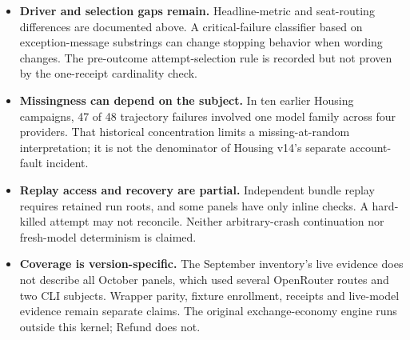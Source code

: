 \begin{itemize}
  compatibility reader coerced falsy values to empty lists, and a writer
  accepted pretty-printed bytes its reader rejected. Fixes and
  regression tests landed before the September snapshot. The incident
  motivates testing the verifier itself; a digest alone is not a
  correctness argument.
\item \textbf{Driver and selection gaps remain.} Headline-metric and
  seat-routing differences are documented above. A critical-failure
  classifier based on exception-message substrings can change stopping
  behavior when wording changes. The pre-outcome attempt-selection
  rule is recorded but not proven by the one-receipt cardinality check.
\item \textbf{Missingness can depend on the subject.} In ten earlier
  Housing campaigns, 47 of 48 trajectory failures involved one model
  family across four providers. That historical concentration limits
  a missing-at-random interpretation; it is not the denominator of
  Housing v14's separate account-fault incident.
\item \textbf{Replay access and recovery are partial.} Independent
  bundle replay requires retained run roots, and some panels have only
  inline checks. A hard-killed attempt may not reconcile. Neither
  arbitrary-crash continuation nor fresh-model determinism is claimed.
\item \textbf{Coverage is version-specific.} The September inventory's
  live evidence does not describe all October panels, which used
  several OpenRouter routes and two CLI subjects. Wrapper parity,
  fixture enrollment, receipts and live-model evidence remain separate
  claims. The original exchange-economy engine runs outside this kernel;
  Refund does not.
\end{itemize}
